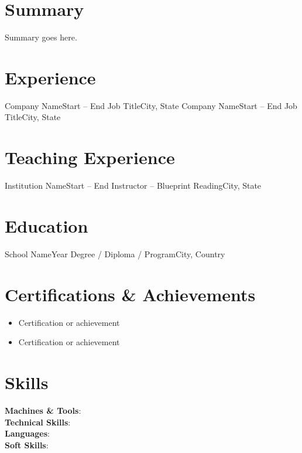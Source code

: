 \documentclass[letterpaper,11pt]{article}
\begin{document}
\section{Summary}
\begin{itemize}[leftmargin=0.15in, label={}]
  \small{\item{Summary goes here.}}
\end{itemize}
\section{Experience}
\resumeSubHeadingListStart
\resumeSubheading
{Company Name}{Start -- End}
{Job Title}{City, State}
\resumeItemListStart
{}
\resumeItemListEnd
\resumeSubheading
{Company Name}{Start -- End}
{Job Title}{City, State}
\resumeItemListStart
{}
\resumeItemListEnd
\resumeSubHeadingListEnd
\section{Teaching Experience}
\resumeSubHeadingListStart
\resumeSubheading
{Institution Name}{Start -- End}
{Instructor -- Blueprint Reading}{City, State}
\resumeItemListStart
{}
\resumeItemListEnd
\resumeSubHeadingListEnd
\section{Education}
\resumeSubHeadingListStart
\resumeSubheading
{School Name}{Year}
{Degree / Diploma / Program}{City, Country}
\resumeSubHeadingListEnd
\section{Certifications \& Achievements}
\begin{itemize}
  \item Certification or achievement
  \item Certification or achievement
\end{itemize}
\section{Skills}
\begin{itemize}[leftmargin=0.15in, label={}]
    \small{
    \item{
        \textbf{Machines \& Tools}{: } \\[0.5em]
        \textbf{Technical Skills}{: } \\[0.5em]
        \textbf{Languages}{: } \\[0.5em]
        \textbf{Soft Skills}{: } \\[0.5em]
      }
    }
\end{itemize}
\end{document}
